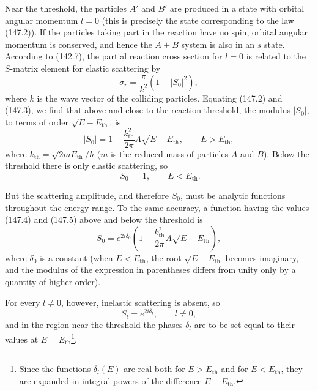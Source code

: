 Near the threshold, the particles $A'$ and $B'$ are produced in a state with orbital angular momentum $l=0$ (this is precisely the state corresponding to the law (147.2)). If the particles taking part in the reaction have no spin, orbital angular momentum is conserved, and hence the $A+B$ system is also in an $s$ state. According to (142.7), the partial reaction cross section for $l=0$ is related to the $S$-matrix element for elastic scattering by
\begin{equation}
 \sigma_r=\frac\pi{k^2}(1-|S_0|^2),
 \tag{147.3}
\end{equation}
where $k$ is the wave vector of the colliding particles. Equating (147.2) and (147.3), we find that above and close to the reaction threshold, the modulus $|S_0|$, to terms of order $\sqrt{E-E_{\mathrm{th}}}$, is
\begin{equation}
 |S_0|=1-\frac{k_{\mathrm{th}}^2}{2\pi}A\sqrt{E-E_{\mathrm{th}}},\qquad E>E_{\mathrm{th}},
 \tag{147.4}
\end{equation}
where $k_{\mathrm{th}}=\sqrt{2mE_{\mathrm{th}}}/\hbar$ ($m$ is the reduced mass of particles $A$ and $B$). Below the threshold there is only elastic scattering, so
\begin{equation}
 |S_0|=1,\qquad E<E_{\mathrm{th}}.
 \tag{147.5}
\end{equation}

But the scattering amplitude, and therefore $S_0$, must be analytic functions throughout the energy range. To the same accuracy, a function having the values (147.4) and (147.5) above and below the threshold is
\begin{equation}
 S_0=e^{2i\delta_0}\left(1-\frac{k_{\mathrm{th}}^2}{2\pi}A\sqrt{E-E_{\mathrm{th}}}\right),
 \tag{147.6}
\end{equation}
where $\delta_0$ is a constant (when $E<E_{\mathrm{th}}$, the root $\sqrt{E-E_{\mathrm{th}}}$ becomes imaginary, and the modulus of the expression in parentheses differs from unity only by a quantity of higher order).

For every $l\ne0$, however, inelastic scattering is absent, so
\begin{equation}
 S_l=e^{2i\delta_l},\qquad l\ne0,
 \tag{147.7}
\end{equation}
and in the region near the threshold the phases $\delta_l$ are to be set equal to their values at $E=E_{\mathrm{th}}$\footnote{Since the functions $\delta_l(E)$ are real both for $E>E_{\mathrm{th}}$ and for $E<E_{\mathrm{th}}$, they are expanded in integral powers of the difference $E-E_{\mathrm{th}}$.}.

